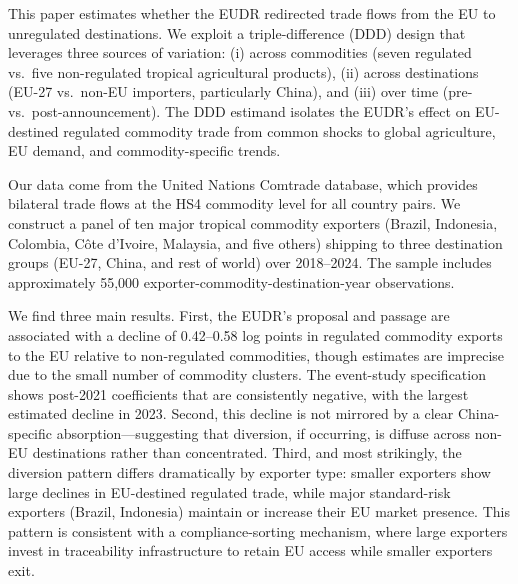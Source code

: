 \documentclass[12pt]{article}
\begin{document}
This paper estimates whether the EUDR redirected trade flows from the EU to unregulated destinations. We exploit a triple-difference (DDD) design that leverages three sources of variation: (i) across commodities (seven regulated vs.\ five non-regulated tropical agricultural products), (ii) across destinations (EU-27 vs.\ non-EU importers, particularly China), and (iii) over time (pre- vs.\ post-announcement). The DDD estimand isolates the EUDR's effect on EU-destined regulated commodity trade from common shocks to global agriculture, EU demand, and commodity-specific trends.

Our data come from the United Nations Comtrade database, which provides bilateral trade flows at the HS4 commodity level for all country pairs. We construct a panel of ten major tropical commodity exporters (Brazil, Indonesia, Colombia, C\^ote d'Ivoire, Malaysia, and five others) shipping to three destination groups (EU-27, China, and rest of world) over 2018--2024. The sample includes approximately 55,000 exporter-commodity-destination-year observations.

We find three main results. First, the EUDR's proposal and passage are associated with a decline of 0.42--0.58 log points in regulated commodity exports to the EU relative to non-regulated commodities, though estimates are imprecise due to the small number of commodity clusters. The event-study specification shows post-2021 coefficients that are consistently negative, with the largest estimated decline in 2023. Second, this decline is not mirrored by a clear China-specific absorption---suggesting that diversion, if occurring, is diffuse across non-EU destinations rather than concentrated. Third, and most strikingly, the diversion pattern differs dramatically by exporter type: smaller exporters show large declines in EU-destined regulated trade, while major standard-risk exporters (Brazil, Indonesia) maintain or increase their EU market presence. This pattern is consistent with a compliance-sorting mechanism, where large exporters invest in traceability infrastructure to retain EU access while smaller exporters exit.
\end{document}
